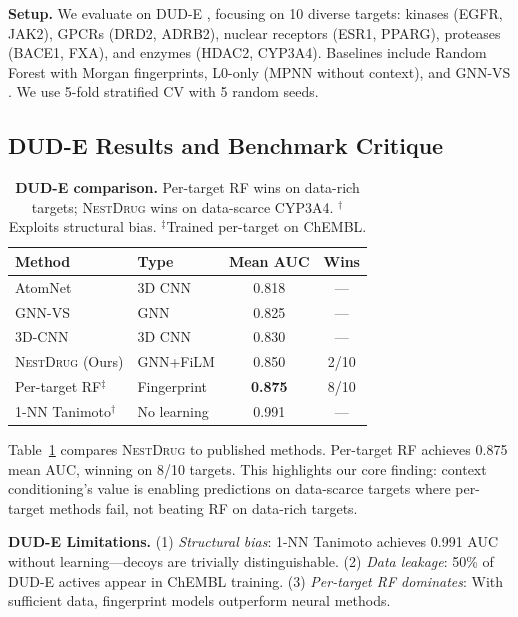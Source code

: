 \documentclass{article}
\newcommand{\methodname}{\textsc{NestDrug}}
\begin{document}
\textbf{Setup.} We evaluate on DUD-E \citep{mysinger_2012_dude}, focusing on 10 diverse targets: kinases (EGFR, JAK2), GPCRs (DRD2, ADRB2), nuclear receptors (ESR1, PPARG), proteases (BACE1, FXA), and enzymes (HDAC2, CYP3A4). Baselines include Random Forest with Morgan fingerprints, L0-only (MPNN without context), and GNN-VS \citep{lim_2019_gnn_vs}. We use 5-fold stratified CV with 5 random seeds.

\subsection{DUD-E Results and Benchmark Critique}

\begin{table}[t]
\vspace{-2mm}
\caption{\textbf{DUD-E comparison.} Per-target RF wins on data-rich targets; \methodname{} wins on data-scarce CYP3A4. $^\dagger$Exploits structural bias. $^\ddagger$Trained per-target on ChEMBL.}
\label{tab:sota}
\centering
\small
\begin{tabular}{@{}llcc@{}}
\toprule
\textbf{Method} & \textbf{Type} & \textbf{Mean AUC} & \textbf{Wins} \\
\midrule
AtomNet \citep{wallach_2015_atomnet} & 3D CNN & 0.818 & --- \\
GNN-VS \citep{lim_2019_gnn_vs} & GNN & 0.825 & --- \\
3D-CNN \citep{ragoza_2017_3dcnn} & 3D CNN & 0.830 & --- \\
\methodname{} (Ours) & GNN+FiLM & 0.850 & 2/10 \\
Per-target RF$^\ddagger$ & Fingerprint & \textbf{0.875} & 8/10 \\
\midrule
1-NN Tanimoto$^\dagger$ & No learning & 0.991 & --- \\
\bottomrule
\end{tabular}
\vspace{-2mm}
\end{table}

Table~\ref{tab:sota} compares \methodname{} to published methods. Per-target RF achieves 0.875 mean AUC, winning on 8/10 targets. This highlights our core finding: context conditioning's value is enabling predictions on data-scarce targets where per-target methods fail, not beating RF on data-rich targets.

\textbf{DUD-E Limitations.} (1) \textit{Structural bias}: 1-NN Tanimoto achieves 0.991 AUC without learning---decoys are trivially distinguishable. (2) \textit{Data leakage}: 50\% of DUD-E actives appear in ChEMBL training. (3) \textit{Per-target RF dominates}: With sufficient data, fingerprint models outperform neural methods.
\end{document}
